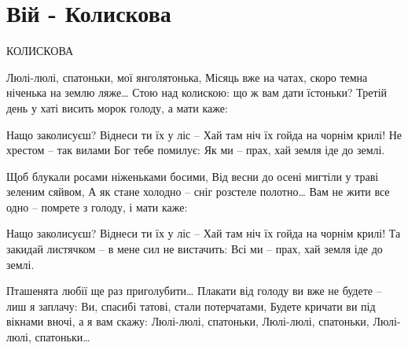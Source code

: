 \section{Вій - Колискова}
\begin{guitar}
КОЛИСКОВА

Люлі-люлі, спатоньки, мої янголятонька,
Місяць вже на чатах, скоро темна ніченька на землю ляже…
Стою над колискою: що ж вам дати їстоньки?
Третій день у хаті висить морок голоду, а мати каже:

Нащо заколисуєш? Віднеси ти їх у ліс – 
Хай там ніч їх гойда на чорнім крилі!
Не хрестом – так вилами Бог тебе помилує:
Як ми – прах, хай земля іде до землі.

Щоб блукали росами ніженьками босими,
Від весни до осені мигтіли у траві зеленим сяйвом,
А як стане холодно – сніг розстеле полотно…
Вам не жити все одно – помрете з голоду, і мати каже:

Нащо заколисуєш? Віднеси ти їх у ліс – 
Хай там ніч їх гойда на чорнім крилі!
Та закидай листячком – в мене сил не вистачить:
Всі ми – прах, хай земля іде до землі.

Пташенята любії ще раз приголубити…
Плакати від голоду ви вже не будете – лиш я заплачу:
Ви, спасибі татові, стали потерчатами,
Будете кричати ви під вікнами вночі, а я вам скажу:
Люлі-люлі, спатоньки,
Люлі-люлі, спатоньки,
Люлі-люлі, спатоньки…
\end{guitar}